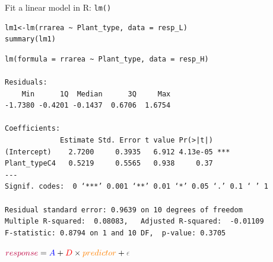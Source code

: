 \documentclass{beamer}
\makeatletter
\newenvironment{kframe}{%
 \def\at@end@of@kframe{}%
 \ifinner\ifhmode%
  \def\at@end@of@kframe{\end{minipage}}%
  \begin{minipage}{\columnwidth}%
 \fi\fi%
 \def\FrameCommand##1{\hskip\@totalleftmargin \hskip-\fboxsep
 \colorbox{shadecolor}{##1}\hskip-\fboxsep
     \hskip-\linewidth \hskip-\@totalleftmargin \hskip\columnwidth}%
 \MakeFramed {\advance\hsize-\width
   \@totalleftmargin\z@ \linewidth\hsize
   \@setminipage}}%
 {\par\unskip\endMakeFramed%
 \at@end@of@kframe}
\newenvironment{knitrout}{}{} %
\makeatother
\begin{document}
\begin{frame}[fragile]{Fit a linear model in R: \texttt{lm()}}

\begin{knitrout}
\color{fgcolor}\begin{kframe}
\begin{verbatim}
lm1<-lm(rrarea ~ Plant_type, data = resp_L)
summary(lm1)
\end{verbatim}
\end{kframe}
\end{knitrout}

\vspace{-0.15cm}
\pause
\begin{knitrout}
\color{fgcolor}\begin{kframe}
\footnotesize
\begin{verbatim}
lm(formula = rrarea ~ Plant_type, data = resp_H)

Residuals:
    Min      1Q  Median      3Q     Max 
-1.7380 -0.4201 -0.1437  0.6706  1.6754 

Coefficients:
             Estimate Std. Error t value Pr(>|t|)    
(Intercept)    2.7200     0.3935   6.912 4.13e-05 ***
Plant_typeC4   0.5219     0.5565   0.938     0.37    
---
Signif. codes:  0 ‘***’ 0.001 ‘**’ 0.01 ‘*’ 0.05 ‘.’ 0.1 ‘ ’ 1

Residual standard error: 0.9639 on 10 degrees of freedom
Multiple R-squared:  0.08083,	Adjusted R-squared:  -0.01109 
F-statistic: 0.8794 on 1 and 10 DF,  p-value: 0.3705
\end{verbatim}
\end{kframe}
\end{knitrout}

\pause
${\color{purple}{response}} = {\color{blue}{A}} + {\color{red}{D}} \times {\color{orange}{predictor}} + {\color{gray}{\epsilon}}$

\end{frame}
\end{document}
